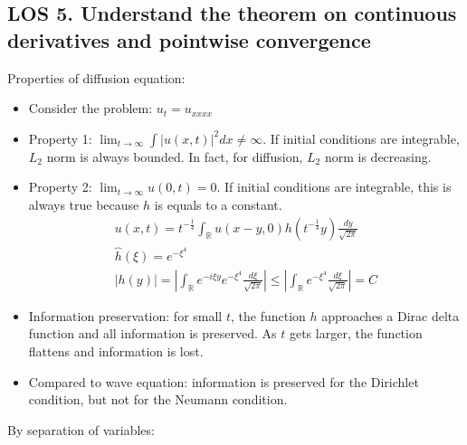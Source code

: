 \documentclass[12pt, a4paper]{article}
\begin{document}
\subsection*{LOS 5. Understand the theorem on continuous derivatives and pointwise convergence}
Properties of diffusion equation:
\begin{itemize}
    \item Consider the problem: $u_t = u_{xxxx}$
    \item Property 1: $\lim_{t\to\infty} \int |u(x, t)|^2 dx \ne \infty$. If initial conditions are integrable, $L_2$ norm is always bounded. In fact, for diffusion, $L_2$ norm is decreasing.
    \item Property 2: $\lim_{t\to\infty} u(0, t) = 0$. If initial conditions are integrable, this is always true because $h$ is equals to a constant. 
    \begin{gather*}
        u(x, t)= t^{-\frac{1}{4}} \int_\mathbb{R}u(x-y, 0) h(t^{-\frac{1}{4}}y) \frac{dy}{\sqrt{2\pi}}\\
        \hat{h}(\xi) = e^{-\xi^4}\\
        |h(y)|=\left|\int_\mathbb{R}e^{-i\xi y} e^{-\xi^4}\frac{d\xi}{\sqrt{2\pi}}\right|\leq\left|\int_\mathbb{R} e^{-\xi^4}\frac{d\xi}{\sqrt{2\pi}}\right| = C
    \end{gather*} 
    \item Information preservation: for small $t$, the function $h$ approaches a Dirac delta function and all information is preserved. As $t$ gets larger, the function flattens and information is lost.
    \item Compared to wave equation: information is preserved for the Dirichlet condition, but not for the Neumann condition.\\
\end{itemize}
By separation of variables:
\end{document}
